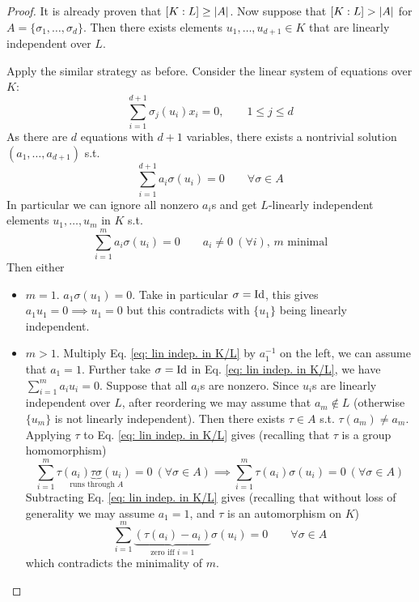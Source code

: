 \begin{proof}
    It is already proven that $[K : L] \geq \left|A\right|$. Now suppose that $[K : L] > \left|A\right|$ for $A = \{\sigma_1, \dots, \sigma_d\}$. Then there exists elements $u_1, \dots, u_{d+1} \in K$ that are linearly independent over $L$. 

    Apply the similar strategy as before. Consider the linear system of equations over $K$: 
    \[
        \sum_{i = 1}^{d+1} \sigma_j(u_i) x_i = 0, \qquad 1 \leq j \leq d
    \]
    As there are $d$ equations with $d+1$ variables, there exists a nontrivial solution $(a_1, \dots, a_{d+1})$ s.t.
    \[
        \sum_{i = 1}^{d+1} a_i \sigma(u_i) = 0 \qquad \forall \sigma \in A
    \]
    In particular we can ignore all nonzero $a_i$s and get $L$-linearly independent elements $u_1, \dots, u_m$ in $K$ s.t. 
    \begin{equation}\tag{$\ast$}\label{eq: lin indep. in K/L}
        \sum_{i = 1}^m a_i\sigma(u_i) = 0 \qquad \text{$a_i \neq 0\ (\forall i)$, $m$ minimal}
    \end{equation}
    Then either
    \begin{itemize}
        \item $m = 1$. $a_1 \sigma(u_1) = 0$. Take in particular $\sigma = \mathrm{Id}$, this gives $a_1 u_1 = 0 \implies u_1 = 0$ but this contradicts with $\{u_1\}$ being linearly independent. 
        \item $m > 1$. Multiply Eq. \eqref{eq: lin indep. in K/L} by $a_1^{-1}$ on the left, we can assume that $a_1 = 1$. Further take $\sigma = \mathrm{Id}$ in Eq. \eqref{eq: lin indep. in K/L}, we have $\sum_{i = 1}^m a_i u_i = 0$. Suppose that all $a_i$s are nonzero. Since $u_i$s are linearly independent over $L$, after reordering we may assume that $a_m \notin L$ (otherwise $\{u_m\}$ is not linearly independent). Then there exists $\tau \in A$ s.t. $\tau(a_m) \neq a_m$. Applying $\tau$ to Eq. \eqref{eq: lin indep. in K/L} gives (recalling that $\tau$ is a group homomorphism)
        \[
            \sum_{i = 1}^m \tau\underset{\text{runs through $A$}}{(a_i) \underbrace{\tau \sigma}(u_i)} = 0\ (\forall \sigma \in A) \implies \sum_{i = 1}^m \tau(a_i) \sigma(u_i) = 0 \ (\forall \sigma \in A)
        \]
        Subtracting Eq. \eqref{eq: lin indep. in K/L} gives (recalling that without loss of generality we may assume $a_1 = 1$, and $\tau$ is an automorphism on $K$)
        \[
            \sum_{i = 1}^m \underbrace{\left(\tau(a_i) - a_i\right)}_{\text{zero iff $i = 1$}} \sigma(u_i) = 0 \qquad \forall \sigma \in A
        \]
        which contradicts the minimality of $m$. 
    \end{itemize}
\end{proof}

